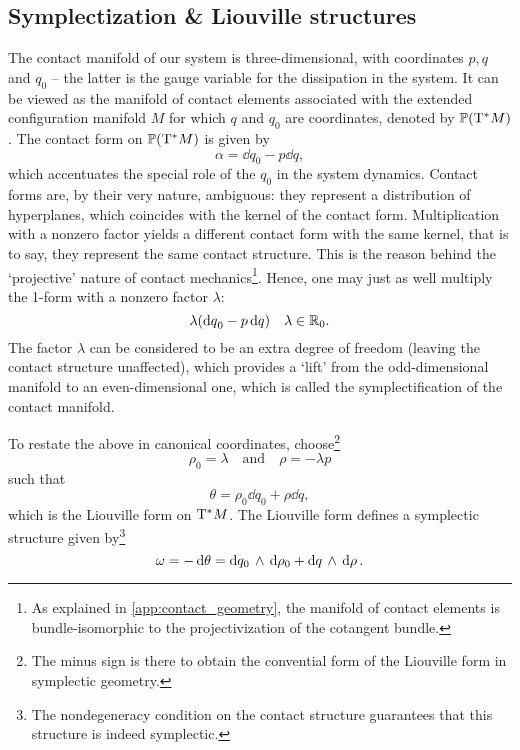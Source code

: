 \subsection{Symplectization \& Liouville structures}
The contact manifold of our system is three-dimensional, with coordinates $p, q$ and $q_0$ -- the latter is the gauge variable for the dissipation in the system. It can be viewed as the manifold of contact elements associated with the extended configuration manifold $M$ for which $q$ and $q_0$ are coordinates, denoted by $\mathbb{P}\qty(\mathrm{T}^*M)$. The contact form on $\mathbb{P}\qty(\mathrm{T}^*M)$ is given by 
\begin{equation}
    \alpha = \dd{q}_0 - p\dd{q},
    \label{eq:dho_contact_form}
\end{equation}
which accentuates the special role of the $q_0$ in the system dynamics. Contact forms are, by their very nature, ambiguous: they represent a distribution of hyperplanes, which coincides with the kernel of the contact form. Multiplication with a nonzero factor yields a different contact form with the same kernel, that is to say, they represent the same contact structure. This is the reason behind the `projective' nature of contact mechanics\footnote{As explained in \cref{app:contact_geometry}, the manifold of contact elements is bundle-isomorphic to the projectivization of the cotangent bundle.}. Hence, one may just as well multiply the 1-form with a nonzero factor $\lambda$:
$$ \lambda\qty(\dd{q}_0 - p\dd{q}) \quad \lambda \in \mathbb{R}_0. $$
The factor $\lambda$ can be considered to be an extra degree of freedom (leaving the contact structure unaffected), which provides a `lift' from the odd-dimensional manifold to an even-dimensional one, which is called the symplectification of the contact manifold. \cite{Arnold1989}

To restate the above in canonical coordinates, choose\footnote
{The minus sign is there to obtain the convential form of the Liouville form in symplectic geometry.}
\begin{equation}
    \rho_0 = \lambda \quad \text{and} \quad \rho = -\lambda p
    \label{eq:homo_coords}
\end{equation}
such that
\begin{equation} 
    \theta = \rho_0\dd{q}_0 + \rho\dd{q}, 
    \label{eq:dho_liouville_form}
\end{equation}
which is the Liouville form on $\mathrm{T}^*M$. \cite[p. 308]{Libermann1987}  The Liouville form defines a symplectic structure given by\footnote
{The nondegeneracy condition on the contact structure guarantees that this structure is indeed symplectic.}
$$\omega = -\dd{\theta} =  \dd{q_0}\,\wedge\,\dd{\rho_0}  +  \dd{q}\,\wedge\,\dd{\rho} .$$ 

